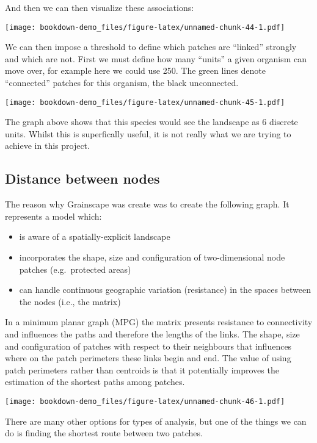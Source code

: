 \documentclass[
]{book}
\providecommand{\tightlist}{%
  \setlength{\itemsep}{0pt}\setlength{\parskip}{0pt}}
\begin{document}
And then we can then visualize these associations:

\texttt{[image: bookdown-demo\_files/figure-latex/unnamed-chunk-44-1.pdf]}

We can then impose a threshold to define which patches are ``linked'' strongly and which are not. First we must define how many ``units'' a given organism can move over, for example here we could use 250. The green lines denote ``connected'' patches for this organism, the black unconnected.

\texttt{[image: bookdown-demo\_files/figure-latex/unnamed-chunk-45-1.pdf]}

The graph above shows that this species would see the landscape as 6 discrete units. Whilst this is superfically useful, it is not really what we are trying to achieve in this project.

\hypertarget{distance-between-nodes}{%
\subsection{Distance between nodes}\label{distance-between-nodes}}

The reason why Grainscape was create was to create the following graph. It represents a model which:

\begin{itemize}
\tightlist
\item
  is aware of a spatially-explicit landscape
\item
  incorporates the shape, size and configuration of two-dimensional node patches (e.g.~protected areas)
\item
  can handle continuous geographic variation (resistance) in the spaces between the nodes (i.e., the matrix)
\end{itemize}

In a minimum planar graph (MPG) the matrix presents resistance to connectivity and influences the paths and therefore the lengths of the links. The shape, size and configuration of patches with respect to their neighbours that influences where on the patch perimeters these links begin and end. The value of using patch perimeters rather than centroids is that it potentially improves the estimation of the shortest paths among patches.

\texttt{[image: bookdown-demo\_files/figure-latex/unnamed-chunk-46-1.pdf]}

There are many other options for types of analysis, but one of the things we can do is finding the shortest route between two patches.
\end{document}

